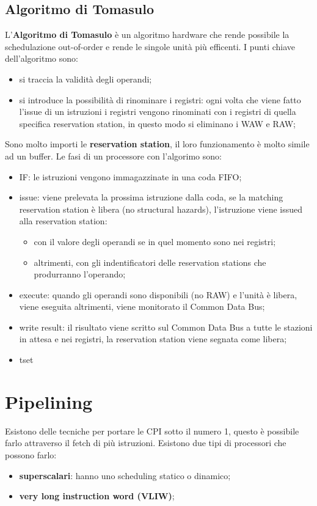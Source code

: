 \documentclass[12pt]{article}
\begin{document}
\subsection{Algoritmo di Tomasulo}
L'\textbf{Algoritmo di Tomasulo} \`e un algoritmo hardware che rende possibile la schedulazione out-of-order e rende le singole unit\`a pi\`u efficenti. I punti chiave dell'algoritmo sono:
\begin{itemize}
    \item si traccia la validit\`a degli operandi;
    \item si introduce la possibilit\`a di rinominare i registri: ogni volta che viene fatto l'issue di un istruzioni i registri vengono rinominati con i registri di quella specifica reservation station, in questo modo si eliminano i WAW e RAW;
\end{itemize}
Sono molto importi le \textbf{reservation station}, il loro funzionamento \`e molto simile ad un buffer. Le fasi di un processore con l'algorimo sono:
\begin{itemize}
    \item IF: le istruzioni vengono immagazzinate in una coda FIFO;
    \item issue: viene prelevata la prossima istruzione dalla coda, se la matching reservation station \`e libera (no structural hazards), l'istruzione viene issued alla reservation station:
        \begin{itemize}
            \item con il valore degli operandi se in quel momento sono nei registri;
            \item altrimenti, con gli indentificatori delle reservation stations che produrranno l'operando;
        \end{itemize}
    \item execute: quando gli operandi sono disponibili (no RAW) e l'unit\`a \`e libera, viene eseguita altrimenti, viene monitorato il Common Data Bus;
    \item write result: il risultato viene scritto sul Common Data Bus a tutte le stazioni in attesa e nei registri, la reservation station viene segnata come libera;

    \item tset
\end{itemize}



\newpage
\section{Pipelining}
Esistono delle tecniche per portare le CPI sotto il numero 1, questo \`e possibile farlo attraverso il fetch di pi\`u istruzioni. Esistono due tipi di processori che possono farlo:
\begin{itemize}
    \item \textbf{superscalari}: hanno uno scheduling statico o dinamico;
    \item \textbf{very long instruction word (VLIW)};
\end{itemize}
\end{document}
